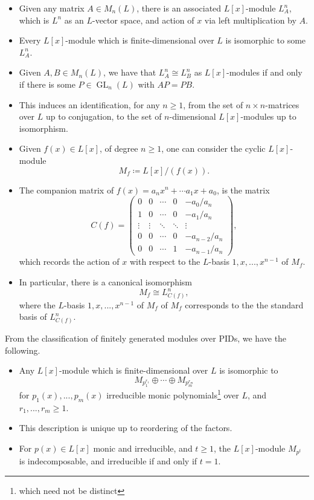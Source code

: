 \documentclass[10pt, reqno, hidelinks]{amsart}
\DeclareMathOperator{\GL}{GL}
\numberwithin{thm}{subsection}
\theoremstyle{definition}
\begin{document}
\begin{itemize}
	\item Given any matrix $A \in M_n(L)$, there is an associated $L[x]$-module $L^n_A$, which is $L^n$ as an $L$-vector space, and action of $x$ via left multiplication by $A$.
	\item Every $L[x]$-module which is finite-dimensional over $L$ is isomorphic to some $L^n_A$.
	\item Given $A, B \in M_n(L)$, we have that $L^n_A \cong L^n_B$ as $L[x]$-modules if and only if there is some $P \in \GL_n(L)$ with $A P = P B$.
	\item This induces an identification, for any $n \geq 1$, from the set of $n \times n$-matrices over $L$ up to conjugation, to the set of $n$-dimensional $L[x]$-modules up to isomorphism.
	\item Given $f(x) \in L[x]$, of degree $n \geq 1$, one can consider the cyclic $L[x]$-module
	\[
	M_f \coloneqq L[x] / (f(x)).
	\]
	\item The companion matrix of $f(x) = a_n x^n + \cdots a_1 x + a_0$, is the matrix 
\[
C(f) = \begin{pmatrix}
	0 & 0 &\cdots & 0 & -a_0 / a_n \\
	1 & 0 & \cdots & 0 & -a_1 / a_n \\
	\vdots & \vdots & \ddots & \ddots & \vdots \\
	0 & 0 & \cdots & 0& -a_{n-2} / a_n  \\
	0 & 0 & \cdots & 1 & -a_{n-1} / a_n
\end{pmatrix},
\]
which records the action of $x$ with respect to the $L$-basis $1, x, ... , x^{n-1}$ of $M_f$.
\item In particular, there is a canonical isomorphism
\[
M_f \cong L^n_{C(f)},
\]
where the $L$-basis $1, x, ... , x^{n-1}$ of $M_f$ of $M_f$ corresponds to the the standard basis of $L^n_{C(f)}$.
\end{itemize}

From the classification of finitely generated modules over PIDs, we have the following.

\begin{itemize}
\item Any $L[x]$-module which is finite-dimensional over $L$ is isomorphic to
\[
M_{p_1^{r_1}} \oplus \cdots \oplus M_{p_m^{r_m}}
\]
for $p_1(x), ... , p_m(x)$ irreducible monic polynomials\footnote{which need not be distinct} over $L$, and $r_1, ... , r_m \geq 1$.

\item This description is unique up to reordering of the factors.

\item For $p(x) \in L[x]$ monic and irreducible, and $t \geq 1$, the $L[x]$-module $M_{p^t}$ is indecomposable, and irreducible if and only if $t = 1$.
\end{itemize}
\end{document}
